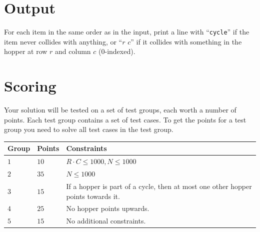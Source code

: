 \section*{Output}
\noindent
For each item in the same order as in the input, 
print a line with ``\texttt{cycle}'' if the item never collides with anything, or ``$r$ $c$'' if it
collides with something in the hopper at row $r$ and column $c$ ($0$-indexed).

\section*{Scoring}
Your solution will be tested on a set of test groups, each worth a number of points. Each test group contains
a set of test cases. To get the points for a test group you need to solve all test cases in the test group.

\noindent
\begin{tabular}{| l | l | p{12cm} |}
  \hline
  \textbf{Group} & \textbf{Points} & \textbf{Constraints} \\ \hline
  $1$    & $10$      & $R \cdot C \le 1000, N \le 1000$ \\ \hline
  $2$    & $35$      & $N \le 1000$ \\ \hline
  $3$    & $15$      & If a hopper is part of a cycle, then at most one other hopper points towards it. \\ \hline
  $4$    & $25$      & No hopper points upwards. \\ \hline
  $5$    & $15$      & No additional constraints. \\ \hline
\end{tabular}
